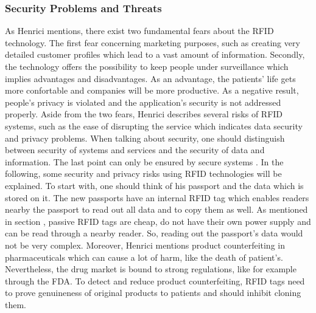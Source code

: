 \subsubsection{Security Problems and Threats} \label{problems}
 
As Henrici \cite{henrici} mentions, there exist two fundamental fears about the RFID technology. The first fear concerning marketing purposes, such as creating very detailed customer profiles which lead to a vast amount of information. Secondly, the technology offers the possibility to keep people under surveillance which implies advantages and disadvantages. As an advantage, the patients' life gets more confortable and companies will be more productive. As a negative result, people's privacy is violated and the application's security is not addressed properly.
Aside from the two fears, Henrici describes several risks of RFID systems, such as the ease of disrupting the service which indicates data security and privacy problems. When talking about security, one should distinguish between security of systems and services and the security of data and information. The last point can only be ensured by secure systems \cite{henrici}. 
In the following, some security and privacy risks using RFID technologies will be explained. To start with, one should think of his passport and the data which is stored on it. The new passports have an internal RFID tag which enables readers nearby the passport to read out all data and to copy them as well. As mentioned in section \pageref{tags}, passive RFID tags are cheap, do not have their own power supply and can be read through a nearby reader. So, reading out the passport's data would not be very complex.
Moreover, Henrici mentions product counterfeiting in pharmaceuticals which can cause a lot of harm, like the death of patient's. Nevertheless, the drug market is bound to strong regulations, like for example through the \ac{FDA}. To detect and reduce product counterfeiting, RFID tags need to prove genuineness of original products to patients and should inhibit cloning them.

